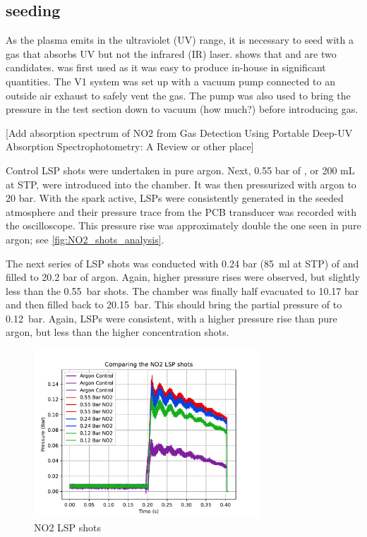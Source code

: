         \subsection{ seeding}
            
            As the plasma emits in the ultraviolet (UV) range, it is necessary to seed with a gas that absorbs UV but not the infrared (IR) laser. \textcite{khanGasDetectionUsing2019} shows that  and  are two candidates.  was first used as it was easy to produce in-house in significant quantities. The V1 system was set up with a vacuum pump connected to an outside air exhaust to safely vent the  gas. The pump was also used to bring the pressure in the test section down to vacuum (how much?) before introducing gas.

            [Add absorption spectrum of NO2 from Gas Detection Using Portable Deep-UV Absorption Spectrophotometry: A Review or other place]

            Control LSP shots were undertaken in pure argon. Next, 0.55 bar of , or 200 mL at STP, were introduced into the chamber. It was then pressurized with argon to 20 bar. With the spark active, LSPs were consistently generated in the seeded atmosphere and their pressure trace from the PCB transducer was recorded with the oscilloscope. This pressure rise was approximately double the one seen in pure argon; see \autoref{fig:NO2_shots_analysis}.

            The next series of LSP shots was conducted with 0.24 bar (\qty{85}{ml} at STP) of  and filled to 20.2 bar of argon. Again, higher pressure rises were observed, but slightly less than the \qty{0.55}{bar} shots. The chamber was finally half evacuated to 10.17 bar and then filled back to \qty{20.15}{bar}. This should bring the partial pressure of  to \qty{0.12}{bar}. Again, LSPs were consistent, with a higher pressure rise than pure argon, but less than the higher concentration  shots.

            \begin{figure}[h]
                \centering
                \includegraphics[width=0.75\textwidth]{assets/4 experiments/NO2_shots_analysis.pdf}
                \caption{NO2 LSP shots}
                \label{fig:NO2_shots_analysis}
            \end{figure}

